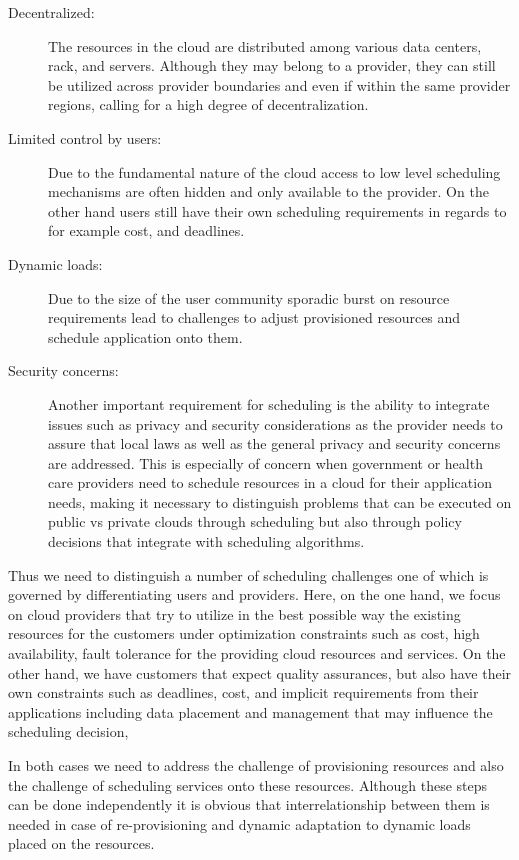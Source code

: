 \documentclass[final,5p,times,twocolumn]{elsarticle}
\begin{document}
\begin{description}
\item [Decentralized:] The resources in the cloud are distributed
  among various data centers, rack, and servers. Although they may
  belong to a provider, they can still be utilized across provider
  boundaries and even if within the same provider regions, calling for
  a high degree of decentralization.

\item[Limited control by users:] Due to the fundamental nature of the
  cloud access to low level scheduling mechanisms are often hidden and
  only available to the provider. On the other hand users still have
  their own scheduling requirements in regards to for example cost,
  and deadlines.
  
\item[Dynamic loads:] Due to the size of the user community sporadic
  burst on resource requirements lead to challenges to adjust
  provisioned resources and schedule application onto them.

\item[Security concerns:] Another important requirement for scheduling
  is the ability to integrate issues such as privacy and security
  considerations as the provider needs to assure that local laws as
  well as the general privacy and security concerns are addressed.
  This is especially of concern when government or health care
  providers need to schedule resources in a cloud for their
  application needs, making it necessary to distinguish problems that
  can be executed on public vs private clouds through scheduling but
  also through policy decisions that integrate with scheduling
  algorithms.
  
\end{description}

Thus we need to distinguish a number of scheduling challenges one of
which is governed by differentiating users and providers. Here, on
the one hand, we focus on cloud providers that try to utilize in the
best possible way the existing resources for the customers under
optimization constraints such as cost, high availability, fault
tolerance for the providing cloud resources and services. On the other
hand, we have customers that expect quality assurances, but also
have their own constraints such as deadlines, cost, and implicit
requirements from their applications including data placement and
management that may influence the scheduling decision,

In both cases we need to address the challenge of provisioning
resources and also the challenge of scheduling services onto these
resources. Although these steps can be done independently it is
obvious that interrelationship between them is needed in case of
re-provisioning and dynamic adaptation to dynamic loads placed on the
resources.
\end{document}

